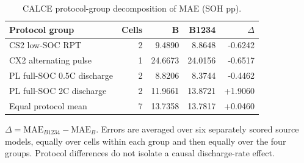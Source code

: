 \begin{table}[!p]
\caption{CALCE protocol-group decomposition of MAE (SOH pp).}\label{tab:calceprotocols}
\papertablesize\setlength{\tabcolsep}{4pt}\renewcommand{\arraystretch}{1.15}
\begin{tabular}{lrrrr}\toprule
Protocol group & Cells & B & B1234 & $\Delta$ \\ \midrule
CS2 low-SOC RPT & 2 & 9.4890 & 8.8648 & -0.6242 \\
CX2 alternating pulse & 1 & 24.6673 & 24.0156 & -0.6517 \\
PL full-SOC 0.5C discharge & 2 & 8.8206 & 8.3744 & -0.4462 \\
PL full-SOC 2C discharge & 2 & 11.9661 & 13.8721 & +1.9060 \\
Equal protocol mean & 7 & 13.7358 & 13.7817 & +0.0460 \\
\bottomrule\end{tabular}
\par\smallskip\begin{minipage}{\linewidth}\papertablesize $\Delta=\mathrm{MAE}_{B1234}-\mathrm{MAE}_B$. Errors are averaged over six separately scored source models, equally over cells within each group and then equally over the four groups. Protocol differences do not isolate a causal discharge-rate effect.\end{minipage}

\end{table}
